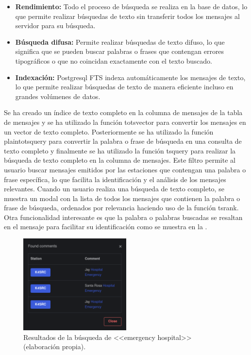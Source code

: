 \begin{itemize}
	\item \textbf{Rendimiento:} Todo el proceso de búsqueda se realiza en la base de datos, lo que permite realizar búsquedas de texto sin transferir todos los mensajes al servidor para su búsqueda.
	\item \textbf{Búsqueda difusa:} Permite realizar búsquedas de texto difuso, lo que significa que se pueden buscar palabras o frases que contengan errores tipográficos o que no coincidan exactamente con el texto buscado.
	\item \textbf{Indexación:} Postgresql FTS indexa automáticamente los mensajes de texto, lo que permite realizar búsquedas de texto de manera eficiente incluso en grandes volúmenes de datos.
\end{itemize}
Se ha creado un índice de texto completo en la columna de mensajes de la tabla de mensajes y se ha utilizado la función to\textunderscore tsvector para convertir los mensajes en un vector de texto completo. Posteriormente se ha utilizado la función plainto\textunderscore tsquery para convertir la palabra o frase de búsqueda en una consulta de texto completo y finalmente se ha utilizado la función ts\textunderscore query para realizar la búsqueda de texto completo en la columna de mensajes. Este filtro permite al usuario buscar mensajes emitidos por las estaciones que contengan una palabra o frase específica, lo que facilita la identificación y el análisis de los mensajes relevantes.
Cuando un usuario realiza una búsqueda de texto completo, se muestra un modal con la lista de todos los mensajes que contienen la palabra o frase de búsqueda, ordenados por relevancia haciendo uso de la función ts\textunderscore rank. Otra funcionalidad interesante es que la palabra o palabras buscadas se resaltan en el mensaje para facilitar su identificación como se muestra en la .

\begin{figure}[h]
	\centering
	\includegraphics[width=0.5\textwidth]{Imagenes/Chapter_4/fts_output.png}
	\caption[Resultados de la búsqueda de <<emergency hospital>>.]{Resultados de la búsqueda de <<emergency hospital>> (elaboración propia).}
	\label{fig:postgres-fts}
\end{figure}

